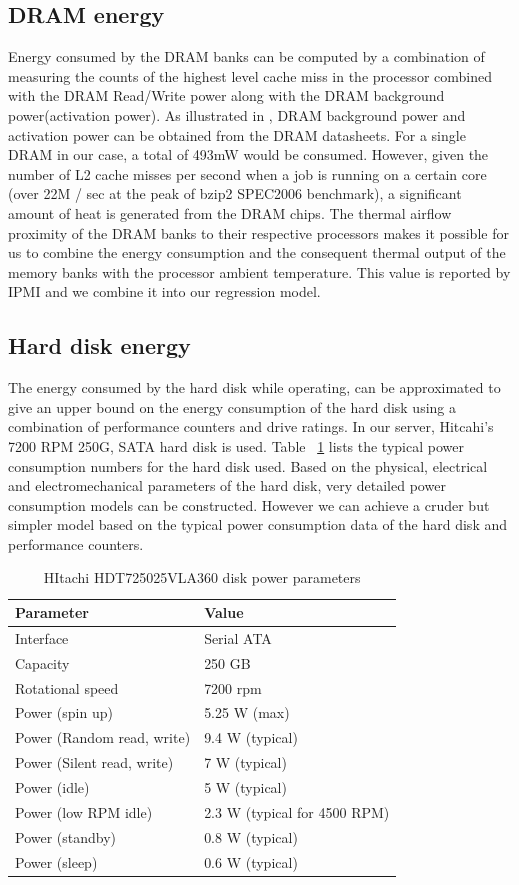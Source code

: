 \documentclass[12pt,onecolumn]{ULieeetran}
\begin{document}
\subsection{DRAM energy}
\label{sec:dram}
Energy consumed by the DRAM banks can be computed by a combination of
measuring the counts of the highest level cache miss in the processor
combined with the DRAM Read/Write power along with the DRAM background
power(activation power).  As illustrated in \cite{Micron2007}, DRAM
background power and activation power can be obtained from the DRAM
datasheets.  For a single DRAM in our case, a total of 493mW would be
consumed. However, given the number of L2 cache misses per second when a
job is running on a certain core (over 22M / sec at the peak of bzip2
SPEC2006 benchmark), a significant amount of heat is generated from the
DRAM chips. The thermal airflow proximity of the DRAM banks to their
respective processors makes it possible for us to combine the energy
consumption and the consequent thermal output of the memory banks with the
processor ambient temperature. This value is reported by IPMI and we
combine it into our regression model.

\subsection{Hard disk energy}
\label{sec:networkengery}
The energy consumed by the hard disk while operating, can be
approximated to give an upper bound on the energy consumption of the
hard disk using a combination of performance counters and drive
ratings. In our server, Hitcahi's 7200 RPM 250G, SATA hard disk is
used. Table ~\ref{tab:hddparam} lists the typical power consumption
numbers for the hard disk used. Based on the physical, electrical and
electromechanical parameters of the hard disk, very detailed power
consumption models can be constructed. However we can achieve a cruder
but simpler model based on the typical power consumption data of the
hard disk and performance counters.

\begin{table}
\centering
\caption{HItachi HDT725025VLA360 disk power parameters}
\begin{tabular}{ l l }
\hline
Parameter & Value \\
\hline
  Interface & Serial ATA  \\
  Capacity & 250 GB  \\
  Rotational speed & 7200 rpm  \\
  Power (spin up) & 5.25 W (max)  \\
  Power (Random read, write) & 9.4 W (typical)  \\
  Power (Silent read, write) & 7 W (typical)  \\
  Power (idle) & 5 W (typical)  \\
  Power (low RPM idle) & 2.3 W (typical for 4500 RPM)  \\
  Power (standby) & 0.8 W (typical)  \\
  Power (sleep) & 0.6 W (typical)  \\
\hline \hline
\end{tabular}
\label{tab:hddparam}
\end{table}
\end{document}
